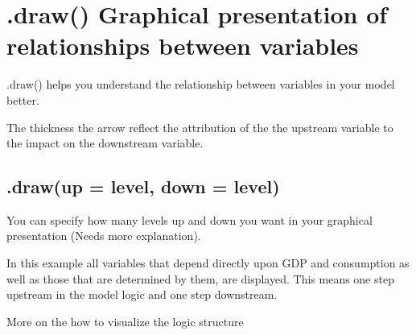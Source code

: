\documentclass[letterpaper,10pt,english]{jupyterBook}
\begin{document}
\section{.draw() Graphical presentation of relationships between variables}
\label{\detokenize{content/notebooks/modelflow_features:draw-graphical-presentation-of-relationships-between-variables}}
\sphinxAtStartPar
.draw() helps you understand the relationship between variables in your model better.

\sphinxAtStartPar
The thickness the arrow reflect the attribution of the the upstream variable to the impact on the downstream variable.


\subsection{.draw(up = level, down = level)}
\label{\detokenize{content/notebooks/modelflow_features:draw-up-level-down-level}}
\sphinxAtStartPar
You can specify how many levels up and down you want in your graphical presentation (Needs more explanation).

\sphinxAtStartPar
In this example all variables that depend directly upon GDP and consumption as well as those that are determined by them, are displayed. This means one step upstream in the model logic and one step downstream.

\sphinxAtStartPar
More on the how to visualize the logic structure 
\end{document}
